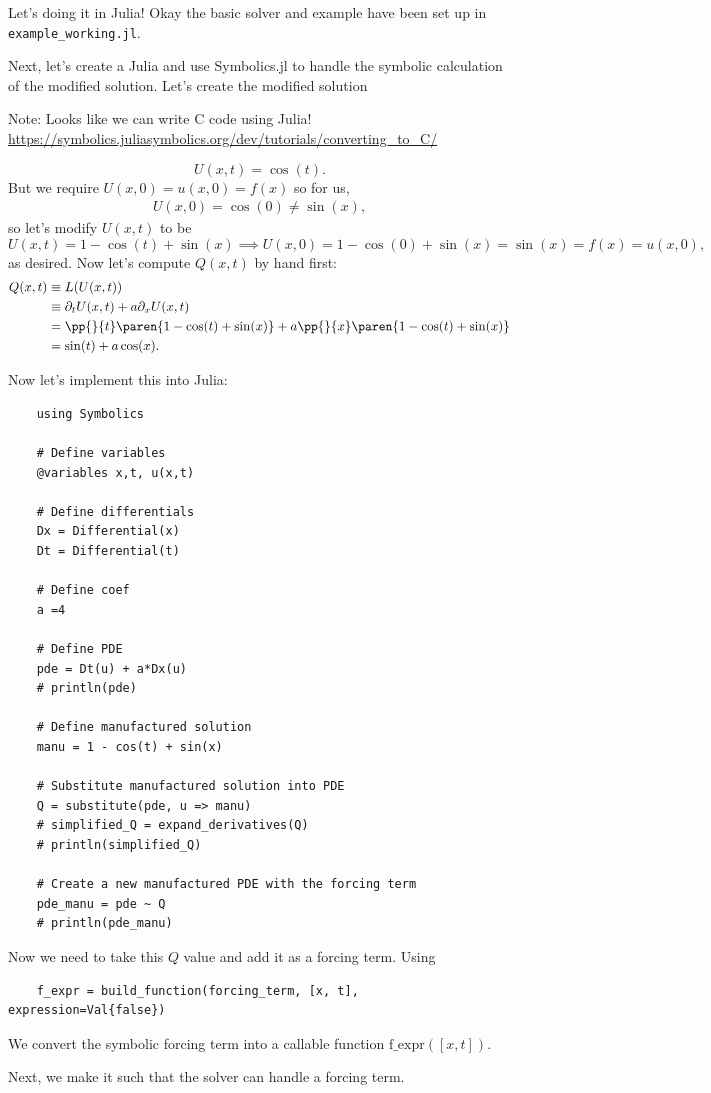 \documentclass[12pt]{report}
\begin{document}
Let's doing it in Julia! Okay the basic solver and example have been set up in \verb+example_working.jl+.

Next, let's create a Julia and use Symbolics.jl to handle the symbolic calculation of the modified solution. Let's create the modified solution

Note: Looks like we can write C code using Julia! \url{https://symbolics.juliasymbolics.org/dev/tutorials/converting_to_C/}


\begin{equation*}
    U(x,t) = \cos(t).
\end{equation*}
But we require $U(x,0) = u(x,0) = f(x)$ so for us,
\begin{align*}
    U(x,0) = \cos(0) \neq \sin(x),
\end{align*}
so let's modify $U(x,t)$ to be
\begin{equation*}
    U(x,t) = 1 - \cos(t) + \sin(x) \implies U(x,0) = 1 - \cos(0) + \sin(x) = \sin(x) = f(x) = u(x,0), 
\end{equation*}
as desired. Now let's compute $Q(x,t)$ by hand first:
 \begin{align*}
    Q(x,t) &\equiv L(U(x,t))\\
    &\equiv \partial_t U(x,t) + a \partial_x U(x,t)\\
    &= \pp{}{t}\paren{1 - \cos(t) + \sin(x)} + a \pp{}{x}\paren{1 - \cos(t) + \sin(x)}\\
    &= \sin(t) + a \cos(x).
 \end{align*}
 
Now let's implement this into Julia:
\begin{lstlisting}
    using Symbolics

    # Define variables
    @variables x,t, u(x,t)
    
    # Define differentials
    Dx = Differential(x)
    Dt = Differential(t)
    
    # Define coef
    a =4
    
    # Define PDE
    pde = Dt(u) + a*Dx(u)
    # println(pde)
    
    # Define manufactured solution
    manu = 1 - cos(t) + sin(x)
    
    # Substitute manufactured solution into PDE
    Q = substitute(pde, u => manu)
    # simplified_Q = expand_derivatives(Q)
    # println(simplified_Q)
    
    # Create a new manufactured PDE with the forcing term
    pde_manu = pde ~ Q
    # println(pde_manu)
\end{lstlisting} 

Now we need to take this $Q$ value and add it as a forcing term. Using

\begin{lstlisting}
    f_expr = build_function(forcing_term, [x, t], expression=Val{false})
\end{lstlisting}

We convert the symbolic forcing term into a callable function $\text{f\_expr}([x,t])$. 

Next, we make it such that the solver can handle a forcing term.
\end{document}
